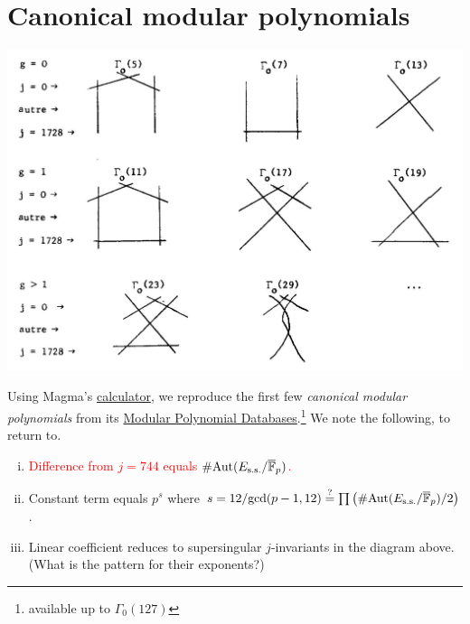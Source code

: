 \documentclass{rs}
\theoremstyle{definition}
\theoremstyle{remark}
\newcommand{\mb}[1]{\mathbb{#1}}
\newcommand{\Aut}{{\rm Aut}}
\newcommand{\cF}{\overline {\mb F}}
\renewcommand{\gcd}{{\rm gcd}}
\newcommand{\G}{\Gamma}
\renewcommand{\=}{\approx}
\renewcommand{\-}{\sim}
\newcommand{\rd}[1]{{\textcolor{red}{#1}}}
\numberwithin{equation}{section}
\begin{document}
\section{Canonical modular polynomials}
\label{sec:cmp}

\begin{center}
 \includegraphics[scale=.23]{ssing} \\
 {\small \cite[Section VI.6]{DR}} 
\end{center}

Using Magma's \href{http://magma.maths.usyd.edu.au/calc}{calculator}, 
we reproduce the first few {\em canonical modular polynomials} from its 
\href{http://magma.maths.usyd.edu.au/magma/handbook/modular_curves}{Modular Polynomial Databases}.\footnote{available up to $\G_0(127)$}  
We note the following, to return to.  

\begin{enumerate}[(i)]
 \item \rd{Difference from $j = 744$ equals $\#\Aut(E_\text{s.s.}/\cF_p)$.}  

 \item Constant term equals $p^s$ where $s = 12 / \gcd(p - 1, 12) \stackrel{?}{=} \prod \big(\#\Aut(E_\text{s.s.}/\cF_p)/2\big)$.  

 \item Linear coefficient reduces to supersingular $j$-invariants in the diagram above.  (What is the pattern for their exponents?)  
\end{enumerate}
\end{document}

